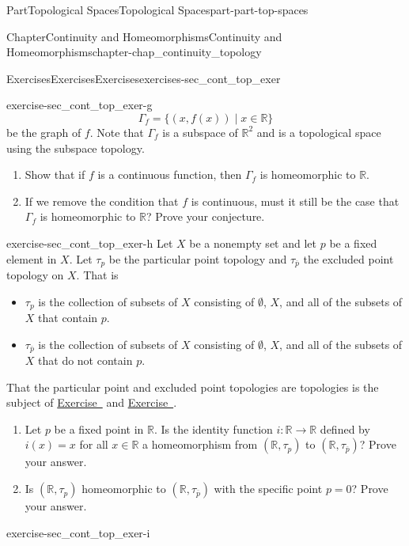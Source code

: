 \documentclass[oneside,10pt,]{book}
\newcommand{\xreffont}{\relax}
\numberwithin{equation}{chapter}
\newcommand{\R}{\mathbb{R}}
\begin{document}
\begin{partptx}{Part}{Topological Spaces}{}{Topological Spaces}{}{}{part-part-top-spaces}
\begin{chapterptx}{Chapter}{Continuity and Homeomorphisms}{}{Continuity and Homeomorphisms}{}{}{chapter-chap_continuity_topology}
\begin{exercises-section}{Exercises}{Exercises}{}{Exercises}{}{}{exercises-sec_cont_top_exer}
\begin{divisionexercise}{7}{}{}{exercise-sec_cont_top_exer-g}
\begin{equation*}
\Gamma_f = \{(x,f(x)) \mid x \in \R\}
\end{equation*}
be the graph of \(f\). Note that \(\Gamma_f\) is a subspace of \(\R^2\) and is a topological space using the subspace topology.%
\begin{enumerate}[font=\bfseries,label=(\alph*),ref=\alph*]%
\item{}Show that if \(f\) is a continuous function, then \(\Gamma_f\) is homeomorphic to \(\R\).%
\item{}If we remove the condition that \(f\) is continuous, must it still be the case that \(\Gamma_f\) is homeomorphic to \(\R\)? Prove your conjecture.%
\end{enumerate}%
\end{divisionexercise}%
\begin{divisionexercise}{8}{}{}{exercise-sec_cont_top_exer-h}%
Let \(X\) be a nonempty set and let \(p\) be a fixed element in \(X\). Let \(\tau_p\) be the particular point topology and \(\tau_{\overline{p}}\) the excluded point topology on \(X\). That is%
\begin{itemize}[label=\textbullet]
\item{}\(\tau_{p}\) is the collection of subsets of \(X\) consisting of \(\emptyset\), \(X\), and all of the subsets of \(X\) that contain \(p\).%
\item{}\(\tau_{\overline{p}}\) is the collection of subsets of \(X\) consisting of \(\emptyset\), \(X\), and all of the subsets of \(X\) that do not contain \(p\).%
\end{itemize}
That the particular point and excluded point topologies are topologies is the subject of \hyperlink{exercise-ex_particular_point_topology}{Exercise~{\xreffont 9}} and \hyperlink{exercise-ex_excluded_point_topology}{Exercise~{\xreffont 10}}.%
\begin{enumerate}[font=\bfseries,label=(\alph*),ref=\alph*]%
\item{}Let \(p\) be a fixed point in \(\R\). Is the identity function \(i: \R \to \R\) defined by \(i(x) = x\) for all \(x \in \R\) a homeomorphism from \((\R, \tau_p)\) to \((\R, \tau_{\overline{p}})\)? Prove your answer.%
\item{}Is \((\R, \tau_{p})\) homeomorphic to \((\R, \tau_{\overline{p}})\) with the specific point \(p=0\)? Prove your answer.%
\end{enumerate}%
\end{divisionexercise}%
\begin{divisionexercise}{9}{}{}{exercise-sec_cont_top_exer-i}%

\end{divisionexercise}
\end{exercises-section}
\end{chapterptx}
\end{partptx}
\end{document}
